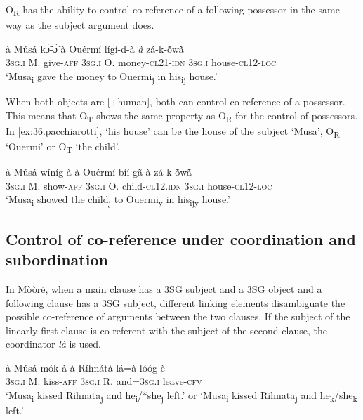 \documentclass[output=paper]{langsci/langscibook}
\begin{document}
O\textsubscript{R} has the ability to control co-reference of a following possessor in the same way as the subject argument does.

\ea
\label{ex:35.pacchiarotti}
\gll \`{a} M\'{u}s\'{a} kɔ̃́-ɔ̃̀ \`{a} Ou\'{e}rm\'{i} l\'{i}g\'{i}-d-\`{a} \textit{\`{a}} z\'{a}-k-\'{\~{o}}w\`{\~{a}}  \\
\textsc{3sg.i}  M.  give-\textsc{aff} \textsc{3sg.i} O. money-\textsc{cl21-idn} \textsc{3sg.i}  house-\textsc{cl12-loc}\\
\glt `Musa\textsubscript{i} gave the money to Ouermi\textsubscript{j} in his\textsubscript{ij} house.'
\z

When both objects are [+human], both can control co-reference of a possessor. This means that O\textsubscript{T} shows the same property as O\textsubscript{R} for the control of possessors. In \ref{ex:36.pacchiarotti}, `his house' can be the house of the subject `Musa', O\textsubscript{R} `Ouermi' or O\textsubscript{T} `the child'.

\ea
\label{ex:36.pacchiarotti}
\gll \`{a} M\'{u}s\'{a} w\'{i}n\'{i}g-\`{a} \`{a} Ou\'{e}rm\'{i} b\'{i}\'{i}-g\`{\~{a}} \`{a} z\'{a}-k-\'{\~{o}}w\`{\~{a}}  \\
\textsc{3sg.i}  M.  show-\textsc{aff} \textsc{3sg.i} O. child\textsc{-cl12.idn} \textsc{3sg.i} house-\textsc{cl12-loc}\\
\glt `Musa\textsubscript{i} showed the child\textsubscript{j} to Ouermi\textsubscript{y} in his\textsubscript{ijy} house.' 
\z

\subsection{Control of co-reference under coordination and subordination}\label{§5.3:control.pacchiarotti}

In M\`{o}\`{o}r\'{e}, when a main clause has a 3SG subject and a 3SG object and a following clause has a 3SG subject, different linking elements disambiguate the possible co-reference of arguments between the two clauses. If the subject of the linearly first clause is co-referent with the subject of the second clause, the coordinator \textit{l\`{a}} is used.

\ea
\label{ex:37.pacchiarotti}
\gll \`{a}    M\'{u}s\'{a}  m\'{o}k-\`{a}    \`{a}    R\'{i}hn\'{a}t\`{a}  l\'{a}=\`{a}      l\'{o}\'{o}g-\`{e}\\
\textsc{3sg.i  }  M.  kiss-\textsc{aff}  \textsc{3sg.i} R.    and=\textsc{3sg.i  }  leave-\textsc{cfv}\\
\glt `Musa\textsubscript{i} kissed Rihnata\textsubscript{j} and he\textsubscript{i}/*she\textsubscript{j} left.' or `Musa\textsubscript{i} kissed Rihnata\textsubscript{j} and he\textsubscript{k}/she\textsubscript{k} left.'
\z
\end{document}
